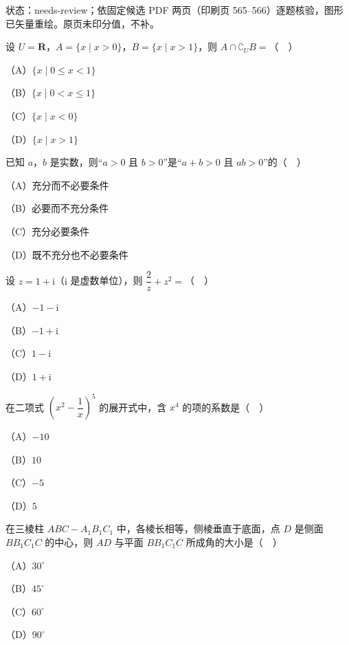 

状态：needs-review；依固定候选 PDF 两页（印刷页 565–566）逐题核验，图形已矢量重绘。原页未印分值，不补。


\begin{question}
设 $U=\mathbf R$，$A=\{x\mid x>0\}$，$B=\{x\mid x>1\}$，则 $A\cap\complement_U B=$（　）

（A）$\{x\mid 0\leqslant x<1\}$

（B）$\{x\mid 0<x\leqslant 1\}$

（C）$\{x\mid x<0\}$

（D）$\{x\mid x>1\}$

\end{question}
\begin{question}
已知 $a$，$b$ 是实数，则“$a>0$ 且 $b>0$”是“$a+b>0$ 且 $ab>0$”的（　）

（A）充分而不必要条件

（B）必要而不充分条件

（C）充分必要条件

（D）既不充分也不必要条件

\end{question}
\begin{question}
设 $z=1+\mathrm i$（$\mathrm i$ 是虚数单位），则 $\dfrac2z+z^2=$（　）

（A）$-1-\mathrm i$

（B）$-1+\mathrm i$

（C）$1-\mathrm i$

（D）$1+\mathrm i$

\end{question}
\begin{question}
在二项式 $\left(x^2-\dfrac1x\right)^5$ 的展开式中，含 $x^4$ 的项的系数是（　）

（A）$-10$

（B）$10$

（C）$-5$

（D）$5$

\end{question}
\begin{question}
在三棱柱 $ABC-A_1B_1C_1$ 中，各棱长相等，侧棱垂直于底面，点 $D$ 是侧面 $BB_1C_1C$ 的中心，则 $AD$ 与平面 $BB_1C_1C$ 所成角的大小是（　）

（A）$30^\circ$

（B）$45^\circ$

（C）$60^\circ$

（D）$90^\circ$

\Needspace{0.4\textheight}
\end{question}
